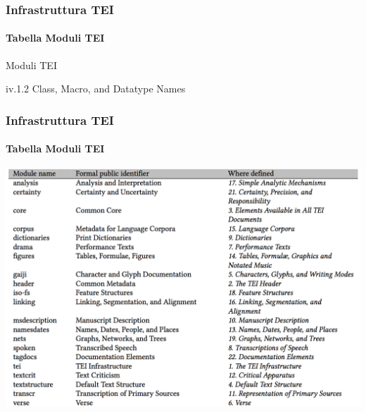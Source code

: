 




\begin{frame}
    \frametitle{Infrastruttura TEI}
    \framesubtitle{Tabella Moduli TEI}
    \addtocounter{nframe}{1}
    
    \begin{block}{Moduli TEI}
        \begin{center}
            iv.1.2 Class, Macro, and Datatype Names
        \end{center}
    \end{block}
\end{frame}


\begin{frame}
    \frametitle{Infrastruttura TEI}
    \framesubtitle{Tabella Moduli TEI}
    \addtocounter{nframe}{1}
    
   
        \begin{center}
        \includegraphics[width=.9\textwidth]{imgs/ModuliTEI.png}
        \end{center}
   
\end{frame}

